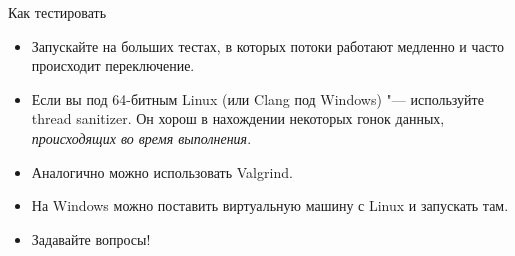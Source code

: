\begin{frame}{Как тестировать}
	\begin{itemize}
		\item Запускайте на больших тестах, в которых потоки работают медленно и часто происходит переключение.
		\item
			Если вы под 64-битным Linux (или Clang под Windows) "--- используйте thread sanitizer.
			Он хорош в нахождении некоторых гонок данных, \textit{происходящих во время выполнения}.
		\item
			Аналогично можно использовать Valgrind.
		\item
			На Windows можно поставить виртуальную машину с Linux и запускать там.
		\item
			Задавайте вопросы!
	\end{itemize}
\end{frame}
